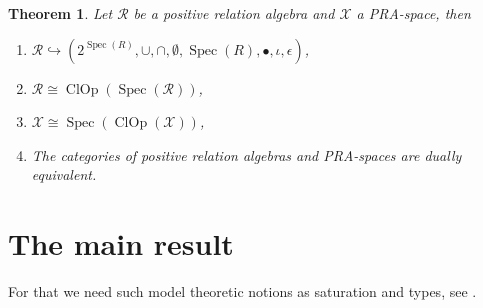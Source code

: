 \documentclass[a4paper]{article}
\theoremstyle{defin}
\theoremstyle{theorem}
\newtheorem{theorem}{Theorem}
\theoremstyle{claim}
\theoremstyle{prop}
\theoremstyle{lemma}
\theoremstyle{fact}
\theoremstyle{ex}
\theoremstyle{col}
\begin{document}
\begin{theorem} Let $\mathcal{R}$ be a positive relation algebra and $\mathcal{X}$ a PRA-space, then

\begin{enumerate}
\item $\mathcal{R} \hookrightarrow (2^{\operatorname{Spec}(R)}, \cup, \cap, \emptyset, \operatorname{Spec}(R), \bullet, \iota, \epsilon)$,
\item $\mathcal{R} \cong \operatorname{ClOp}(\operatorname{Spec}(\mathcal{R}))$,
\item $\mathcal{X} \cong \operatorname{Spec}(\operatorname{ClOp}(\mathcal{X}))$,
\item The categories of positive relation algebras and PRA-spaces are dually equivalent.
\end{enumerate}
\end{theorem}

\section{The main result}

For that we need such model theoretic notions as saturation and types, see \cite[Section 6.3]{hodges1993model}.
\end{document}
